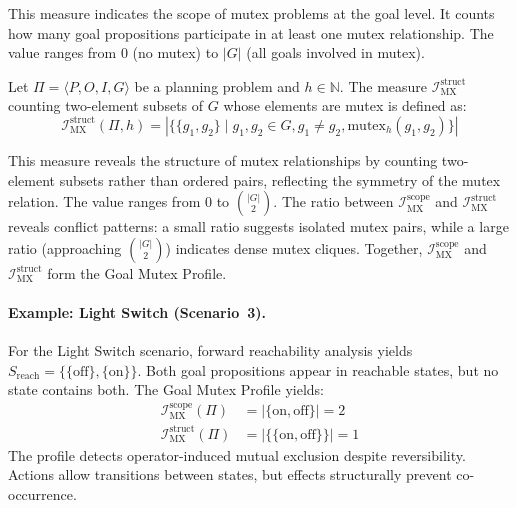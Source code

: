 This measure indicates the scope of mutex problems at the goal level. It counts how many goal propositions participate in at least one mutex relationship. The value ranges from $0$ (no mutex) to $|G|$ (all goals involved in mutex).

\begin{defn}
    Let $\Pi = \langle P, O, I, G \rangle$ be a planning problem and $h \in \mathbb{N}$. The measure $\mathcal{I}^{\text{struct}}_{\text{MX}}$ counting two-element subsets of $G$ whose elements are mutex is defined as:
    \begin{equation*}
        \mathcal{I}^{\text{struct}}_{\text{MX}}(\Pi, h) = |\{\{g_1, g_2\} \mid g_1, g_2 \in G, g_1 \neq g_2, \text{mutex}_h(g_1, g_2)\}|
    \end{equation*}
\end{defn}

This measure reveals the structure of mutex relationships by counting two-ele\-ment subsets rather than ordered pairs, reflecting the symmetry of the mutex relation. The value ranges from $0$ to $\binom{|G|}{2}$. The ratio between $\mathcal{I}^{\text{scope}}_{\text{MX}}$ and $\mathcal{I}^{\text{struct}}_{\text{MX}}$ reveals conflict patterns: a small ratio suggests isolated mutex pairs, while a large ratio (approaching $\binom{|G|}{2}$) indicates dense mutex cliques. Together, $\mathcal{I}^{\text{scope}}_{\text{MX}}$ and $\mathcal{I}^{\text{struct}}_{\text{MX}}$ form the Goal Mutex Profile.

\paragraph{Example: Light Switch (Scenario~3).} For the Light Switch scenario, forward reachability analysis yields $S_{\text{reach}} = \{\{\text{off}\}, \{\text{on}\}\}$. Both goal propositions appear in reachable states, but no state contains both. The Goal Mutex Profile yields:
\begin{align*}
    \mathcal{I}^{\text{scope}}_{\text{MX}}(\Pi)  & = |\{\text{on}, \text{off}\}| = 2     \\
    \mathcal{I}^{\text{struct}}_{\text{MX}}(\Pi) & = |\{\{\text{on}, \text{off}\}\}| = 1
\end{align*}
The profile detects operator-induced mutual exclusion despite reversibility. Actions allow transitions between states, but effects structurally prevent co-occurrence.

